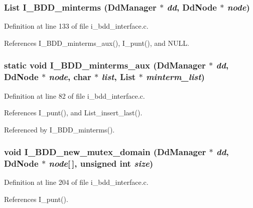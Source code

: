 \subsubsection{\setlength{\rightskip}{0pt plus 5cm}\bf{List} I\_\-BDD\_\-minterms (Dd\-Manager $\ast$ {\em dd}, Dd\-Node $\ast$ {\em node})}\label{i__bdd__interface_8c_460c13ed2babc80e0c9ad1deebc56b4f}




Definition at line 133 of file i\_\-bdd\_\-interface.c.

References I\_\-BDD\_\-minterms\_\-aux(), I\_\-punt(), and NULL.
\subsubsection{\setlength{\rightskip}{0pt plus 5cm}static void I\_\-BDD\_\-minterms\_\-aux (Dd\-Manager $\ast$ {\em dd}, Dd\-Node $\ast$ {\em node}, char $\ast$ {\em list}, \bf{List} $\ast$ {\em minterm\_\-list})\hspace{0.3cm}{\tt  [static]}}\label{i__bdd__interface_8c_30cb0c585c6cbfdc12edabdd63ffe32c}




Definition at line 82 of file i\_\-bdd\_\-interface.c.

References I\_\-punt(), and List\_\-insert\_\-last().

Referenced by I\_\-BDD\_\-minterms().
\subsubsection{\setlength{\rightskip}{0pt plus 5cm}void I\_\-BDD\_\-new\_\-mutex\_\-domain (Dd\-Manager $\ast$ {\em dd}, Dd\-Node $\ast$ {\em node}[$\,$], unsigned int {\em size})}\label{i__bdd__interface_8c_e3594fdd398fe3a15f8ddaf7eb1256a7}




Definition at line 204 of file i\_\-bdd\_\-interface.c.

References I\_\-punt().
